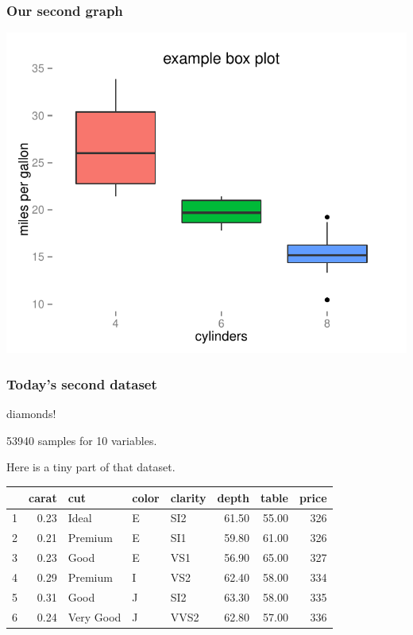 \documentclass{beamer}\usepackage{graphicx, color}
\makeatletter
\def\maxwidth{ %
  \ifdim\Gin@nat@width>\linewidth
    \linewidth
  \else
    \Gin@nat@width
  \fi
}
\newenvironment{knitrout}{}{} %
\makeatother
\begin{document}
\begin{frame}[fragile]
  \frametitle{Our second graph}
\begin{knitrout}
\color{fgcolor}
\includegraphics[width=\maxwidth]{figure/second-plot} 

\end{knitrout}


\end{frame}

\begin{frame}
  \frametitle{Today's second dataset}

  diamonds!

  53940 samples for 10 variables.

  Here is a tiny part of that dataset.

\begin{table}[ht]
\begin{center}
\begin{tabular}{rrlllrrr}
  \hline
 & carat & cut & color & clarity & depth & table & price \\ 
  \hline
1 & 0.23 & Ideal & E & SI2 & 61.50 & 55.00 & 326 \\ 
  2 & 0.21 & Premium & E & SI1 & 59.80 & 61.00 & 326 \\ 
  3 & 0.23 & Good & E & VS1 & 56.90 & 65.00 & 327 \\ 
  4 & 0.29 & Premium & I & VS2 & 62.40 & 58.00 & 334 \\ 
  5 & 0.31 & Good & J & SI2 & 63.30 & 58.00 & 335 \\ 
  6 & 0.24 & Very Good & J & VVS2 & 62.80 & 57.00 & 336 \\ 
   \hline
\end{tabular}
\end{center}
\end{table}



\end{frame}
\end{document}
